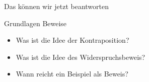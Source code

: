 \begin{frame}[fragile]{Das können wir jetzt beantworten}
	\begin{alertblock}{Grundlagen Beweise}
		\begin{itemize}
			\item Was ist die Idee der Kontraposition?
			\item Was ist die Idee des Widerspruchsbeweis?
			\item Wann reicht ein Beispiel als Beweis?
		\end{itemize}
	\end{alertblock}
\end{frame}